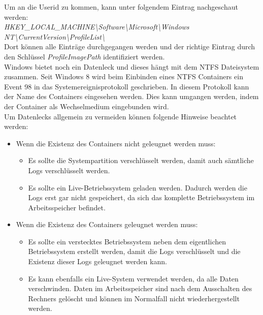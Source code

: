 \documentclass[12pt,a4paper]{scrreprt}
\begin{document}
\noindent Um an die Userid zu kommen, kann unter folgendem Eintrag nachgeschaut werden: \\

\textit{HKEY\_{}LOCAL\_{}MACHINE\textbackslash Software\textbackslash Microsoft\textbackslash Windows NT\textbackslash CurrentVersion\textbackslash ProfileList\textbackslash} \\

\noindent Dort können alle Einträge durchgegangen werden und der richtige Eintrag durch den Schlüssel \textit{ProfileImagePath} identifiziert werden. \\

\noindent Windows bietet noch ein Datenleck und dieses hängt mit dem NTFS Dateisystem zusammen. Seit Windows 8 wird beim Einbinden eines NTFS Containers ein Event 98 in das Systemereignisprotokoll geschrieben. In diesem Protokoll kann der Name des Containers eingesehen werden. Dies kann umgangen werden, indem der Container als Wechselmedium eingebunden wird. \\

\noindent Um Datenlecks allgemein zu vermeiden können folgende Hinweise beachtet werden:

\begin{itemize}
\item Wenn die Existenz des Containers nicht geleugnet werden muss:
\begin{itemize}
\item Es sollte die Systempartition verschlüsselt werden, damit auch sämtliche Logs verschlüsselt werden.
\item Es sollte ein Live-Betriebssystem geladen werden. Dadurch werden die Logs erst gar nicht gespeichert, da sich das komplette Betriebssystem im Arbeitsspeicher befindet.
\end{itemize}
\item Wenn die Existenz des Containers geleugnet werden muss:
\begin{itemize}
\item Es sollte ein verstecktes Betriebssystem neben dem eigentlichen Betriebssystem erstellt werden, damit die Logs verschlüsselt und die Existenz dieser Logs geleugnet werden kann.
\item Es kann ebenfalls ein Live-System verwendet werden, da alle Daten verschwinden. Daten im Arbeitsspeicher sind nach dem Ausschalten des Rechners gelöscht und können im Normalfall nicht wiederhergestellt werden.
\end{itemize}
\end{itemize}
\end{document}
